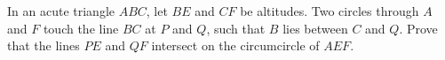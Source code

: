 In an acute triangle $ABC$, let $BE$ and $CF$ be altitudes.
Two circles through $A$ and $F$ touch the line $BC$ at $P$ and $Q$, 
such that $B$ lies between $C$ and $Q$.
Prove that the lines $PE$ and $QF$ intersect on the circumcircle of $AEF$.